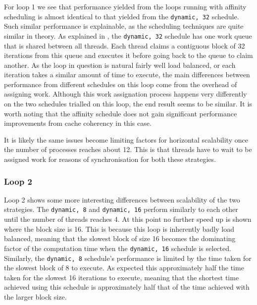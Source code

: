 \documentclass[a4paper,12pt]{article}
\begin{document}
For loop 1 we see that performance yielded from the loops running with affinity scheduling is almost identical to that yielded from the \verb|dynamic, 32| schedule. Such similar performance is explainable, as the scheduling techniques are quite similar in theory. As explained in \cite{intelmp}, the \verb|dynamic, 32| schedule has one work queue that is shared between all threads. Each thread claims a contiguous block of 32 iterations from this queue and executes it before going back to the queue to claim another. As the loop in question is natural fairly well load balanced, or each iteration takes a similar amount of time to execute, the main differences between performance from different schedules on this loop come from the overhead of assigning work. Although this work assignation process happens very differently on the two schedules trialled on this loop, the end result seems to be similar. It is worth noting that the affinity schedule does not gain significant performance improvements from cache coherency in this case.

It is likely the same issues become limiting factors for horizontal scalability once the number of processes reaches about 12. This is that threads have to wait to be assigned work for reasons of synchronisation for both these strategies.

\subsubsection{Loop 2}

Loop 2 shows some more interesting differences between scalability of the two strategies. The \verb|dynamic, 8| and \verb|dynamic, 16| perform similarly to each other until the number of threads reaches 4. At this point no further speed up is shown where the block size is 16. This is because this loop is inherently badly load balanced, meaning that the slowest block of size 16 becomes the dominating factor of the computation time when the \verb|dynamic, 16| schedule is selected. Similarly, the \verb|dynamic, 8| schedule's performance is limited by the time taken for the slowest block of 8 to execute. As expected this approximately half the time taken for the slowest 16 iterations to execute, meaning that the shortest time achieved using this schedule is approximately half that of the time achieved with the larger block size.
\end{document}
